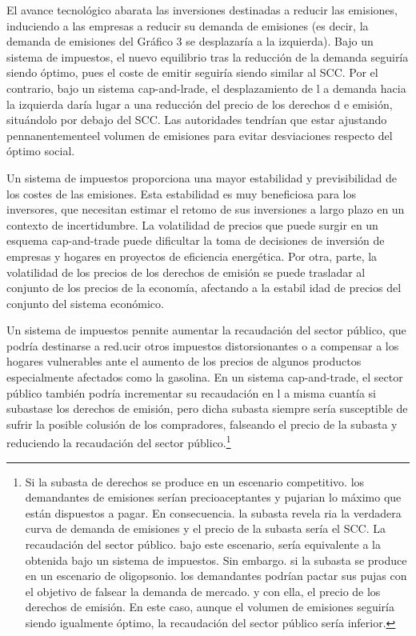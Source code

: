 \documentclass[10pt,a4paper]{article}
\begin{document}
El avance tecnológico abarata las inversiones destinadas a reducir las emisiones, induciendo a las empresas a reducir su demanda de emisiones (es decir, la demanda de emisiones del Gráfico 3 se desplazaría a la izquierda). Bajo un sistema de impuestos, el nuevo equilibrio  tras la reducción de la demanda seguiría siendo óptimo, pues el coste de emitir seguiría siendo similar al SCC. Por el contrario, bajo un sistema cap-and-lrade, el desplazamiento de l a demanda hacia la izquierda daría lugar a una reducción del precio de los derechos d e emisión, situándolo por debajo del SCC. Las autoridades tendrían que estar ajustando pennanentementeel volumen de emisiones para evitar desviaciones respecto del óptimo social.

Un sistema de impuestos proporciona una mayor estabilidad y previsibilidad de los costes de las emisiones. Esta estabilidad es muy beneficiosa para los inversores, que necesitan estimar el retomo de sus inversiones a largo plazo en un contexto de incertidumbre. La volatilidad de precios que puede surgir en un esquema cap-and-trade puede dificultar la toma de decisiones de inversión de empresas y hogares en proyectos de eficiencia energética. Por otra, parte, la volatilidad de los precios de los derechos de emisión se puede trasladar al conjunto de los precios de la economía, afectando a la estabil idad de precios del conjunto del sistema económico. 

Un sistema de impuestos pennite aumentar la recaudación del sector público, que podría destinarse a red.ucir otros impuestos distorsionantes o a compensar a los hogares vulnerables ante el aumento de los precios de algunos productos especialmente afectados como la gasolina. En un sistema cap-and-trade, el sector público también podría incrementar su recaudación en l a misma cuantía si subastase los derechos de emisión, pero dicha subasta siempre sería susceptible de sufrir la posible colusión de los compradores, falseando el precio de la subasta y reduciendo la recaudación del sector público.\footnote{%
    Si la subasta de derechos se produce en un escenario competitivo. los demandantes de emisiones serían precioaceptantes y pujarian lo máximo que están dispuestos a pagar. En consecuencia. la subasta revela ria la verdadera curva de demanda de emisiones y el precio de la subasta sería el SCC. La recaudación del sector público. bajo este escenario, sería equivalente a la obtenida bajo un sistema de impuestos. Sin embargo. si la subasta se produce en un escenario de oligopsonio. los demandantes podrían pactar sus pujas con el objetivo de falsear la demanda de mercado. y con ella, el precio de los derechos de emisión. En este caso, aunque el volumen de emisiones seguiría siendo igualmente óptimo, la recaudación del sector público sería inferior.
}
\end{document}
